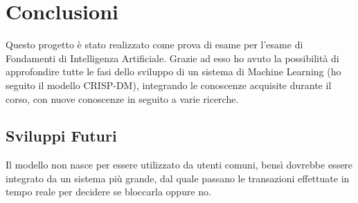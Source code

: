 \documentclass[]{article}
\begin{document}
\section{Conclusioni}
    Questo progetto è stato realizzato come prova di esame per l'esame di Fondamenti di Intelligenza Artificiale. Grazie ad esso ho avuto la possibilità di approfondire tutte le fasi dello sviluppo di un sistema di Machine Learning (ho seguito il modello CRISP-DM), integrando le conoscenze acquisite durante il corso, con nuove conoscenze in seguito a varie ricerche.\\
    \subsection{Sviluppi Futuri}
        Il modello non nasce per essere utilizzato da utenti comuni, bensì dovrebbe essere integrato da un sistema più grande, dal quale passano le transazioni effettuate in tempo reale per decidere se bloccarla oppure no.\\
\end{document}

